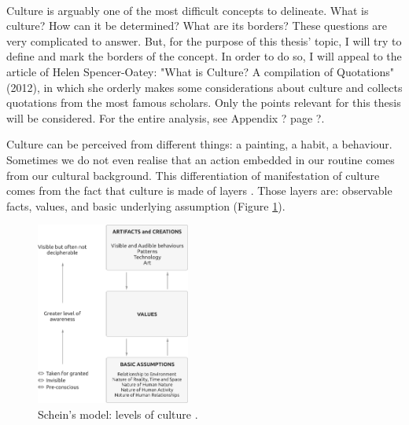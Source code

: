 \documentclass[../main.tex]{subfiles}
\begin{document}
\\

Culture is arguably one of the most difficult concepts to delineate. What is culture? How can it be determined? What are its borders? These questions are very complicated to answer. But, for the purpose of this thesis' topic, I will try to define and mark the borders of the concept. In order to do so, I will appeal to the article of Helen Spencer-Oatey: "What is Culture? A compilation of Quotations"(2012), in which she orderly makes some considerations about culture and collects quotations from the most famous scholars. Only the points relevant for this thesis will be considered. For the entire analysis, see Appendix ? page ?.

Culture can be perceived from different things: a painting, a habit, a behaviour. Sometimes we do not even realise that an action embedded in our routine comes from our cultural background. 
This differentiation of manifestation of culture comes from the fact that culture is made of layers \autocite[3]{schein}.
Those layers are: observable facts, values, and basic underlying assumption (Figure \ref{fig:schein}).
\begin{figure}[h]
    \centering\includegraphics[width=0.45\textwidth]{images/values}
    \caption{Schein's model: levels of culture \autocite[4]{schein}.} %
    \label{fig:schein}
\end{figure}
\end{document}
